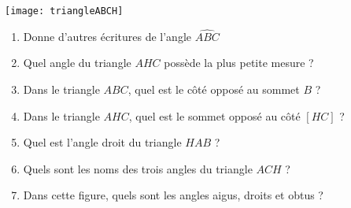 \begin{activite}

\texttt{[image: triangleABCH]}

\begin{enumerate}
\item Donne d'autres écritures de l'angle $\widehat{ABC}$ \dotfill

\item Quel angle du triangle $AHC$ possède la plus petite mesure ?  \dotfill

\item Dans le triangle $ABC$, quel est le côté opposé au sommet $B$ ?  \dotfill

\item Dans le triangle $AHC$, quel est le sommet opposé au côté $[HC]$ ?  \dotfill

\item Quel est l'angle droit du triangle $HAB$ ?  \dotfill

\item Quels sont les noms des trois angles du triangle $ACH$ ?  \dotfill

\item Dans cette figure, quels sont les angles aigus, droits et obtus ?  \dotfill

 \dotfill

 \dotfill
\end{enumerate}

\end{activite}


